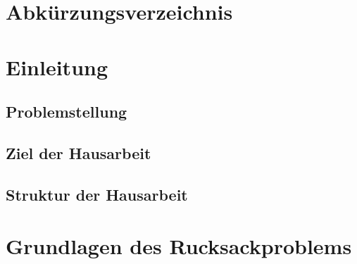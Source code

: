 \documentclass[12pt]{report}
\begin{document}
\listoftables


\newpage
\chapter*{Abkürzungsverzeichnis}

\begin{acronym}[SOAP]
\end{acronym}


\addtocounter{frontmatterPage}{\value{page}} 

\newpage
{}
\chapter{Einleitung}




\section{Problemstellung}


\section{Ziel der Hausarbeit}

\section{Struktur der Hausarbeit}


\newpage
\chapter{Grundlagen des Rucksackproblems}
\end{document}
